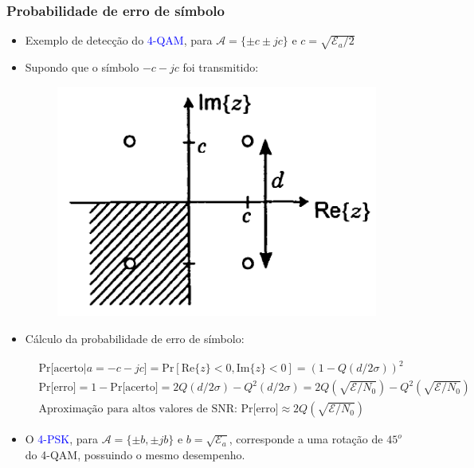 \begin{frame}
	\frametitle{Probabilidade de erro de símbolo}

	\begin{itemize}
	    \item Exemplo de detecção do \textcolor{blue}{4-QAM}, para $\mathcal{A}=\{\pm c \pm jc \}$ e $c=\sqrt{\mathcal{E}_a/2}$
	    \item Supondo que o símbolo $-c-jc$ foi transmitido:
	    \begin{figure}[t]	
	      \begin{center}
		\includegraphics[width=0.3\columnwidth]{figs/pam_45}
	      \end{center}
	    \end{figure}
	    \item Cálculo da probabilidade de erro de símbolo:
	    \begin{footnotesize}
	    \begin{align*}
		    &\text{Pr[acerto}|a=-c-jc] = \mathrm{Pr}[\mathrm{Re}\{z\}<0, \mathrm{Im}\{z\}<0] = (1-Q(d/2\sigma))^2 \\
		    &\text{Pr[erro]} = 1 - \text{Pr[acerto]} = 2Q(d/2\sigma) - Q^2(d/2\sigma) = 2Q(\sqrt{\mathcal{E}/N_0}) - Q^2(\sqrt{\mathcal{E}/N_0}) \\
		    &\text{Aproximação para altos valores de SNR: } \text{Pr[erro]}\approx 2Q(\sqrt{\mathcal{E}/N_0})
	    \end{align*}
	    \end{footnotesize}
	    \item O \textcolor{blue}{4-PSK}, para $\mathcal{A}=\{\pm b, \pm jb \}$ e $b=\sqrt{\mathcal{E}_a}$, corresponde a uma rotação de $45^o$ do 4-QAM, possuindo o mesmo desempenho.
	\end{itemize}	
\end{frame}

